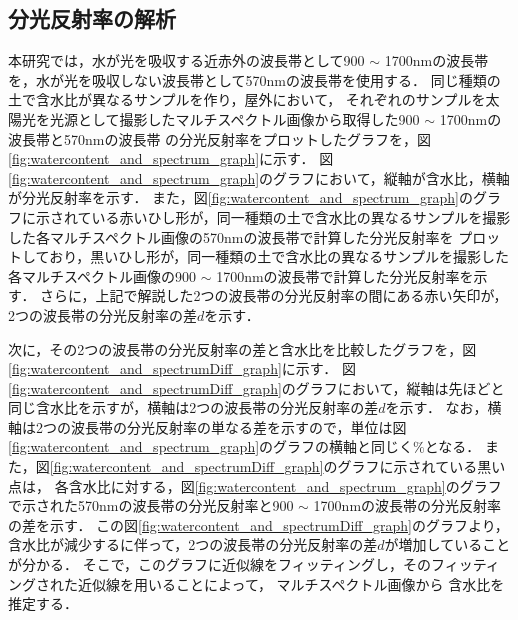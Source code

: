 

\clearpage

\subsection{分光反射率の解析}
\label{ssec:AnalysisOfSpectrum}

本研究では，水が光を吸収する近赤外の波長帯として900 $\sim$ 1700nmの波長帯を，水が光を吸収しない波長帯として570nmの波長帯を使用する．
同じ種類の土で含水比が異なるサンプルを作り，屋外において，
それぞれのサンプルを太陽光を光源として撮影したマルチスペクトル画像から取得した900 $\sim$ 1700nmの波長帯と570nmの波長帯
の分光反射率をプロットしたグラフを，図\ref{fig:watercontent_and_spectrum_graph}に示す．
図\ref{fig:watercontent_and_spectrum_graph}のグラフにおいて，縦軸が含水比，横軸が分光反射率を示す．
また，図\ref{fig:watercontent_and_spectrum_graph}のグラフに示されている赤いひし形が，同一種類の土で含水比の異なるサンプルを撮影した各マルチスペクトル画像の570nmの波長帯で計算した分光反射率を
プロットしており，黒いひし形が，同一種類の土で含水比の異なるサンプルを撮影した各マルチスペクトル画像の900 $\sim$ 1700nmの波長帯で計算した分光反射率を示す．
さらに，上記で解説した2つの波長帯の分光反射率の間にある赤い矢印が，2つの波長帯の分光反射率の差$d$を示す．

次に，その2つの波長帯の分光反射率の差と含水比を比較したグラフを，図\ref{fig:watercontent_and_spectrumDiff_graph}に示す．
図\ref{fig:watercontent_and_spectrumDiff_graph}のグラフにおいて，縦軸は先ほどと同じ含水比を示すが，横軸は2つの波長帯の分光反射率の差$d$を示す．
なお，横軸は2つの波長帯の分光反射率の単なる差を示すので，単位は図\ref{fig:watercontent_and_spectrum_graph}のグラフの横軸と同じく$\%$となる．
また，図\ref{fig:watercontent_and_spectrumDiff_graph}のグラフに示されている黒い点は，
各含水比に対する，図\ref{fig:watercontent_and_spectrum_graph}のグラフで示された570nmの波長帯の分光反射率と900 $\sim$ 1700nmの波長帯の分光反射率の差を示す．
この図\ref{fig:watercontent_and_spectrumDiff_graph}のグラフより，含水比が減少するに伴って，2つの波長帯の分光反射率の差$d$が増加していることが分かる．
そこで，このグラフに近似線をフィッティングし，そのフィッティングされた近似線を用いることによって，
マルチスペクトル画像から
含水比を推定する．

